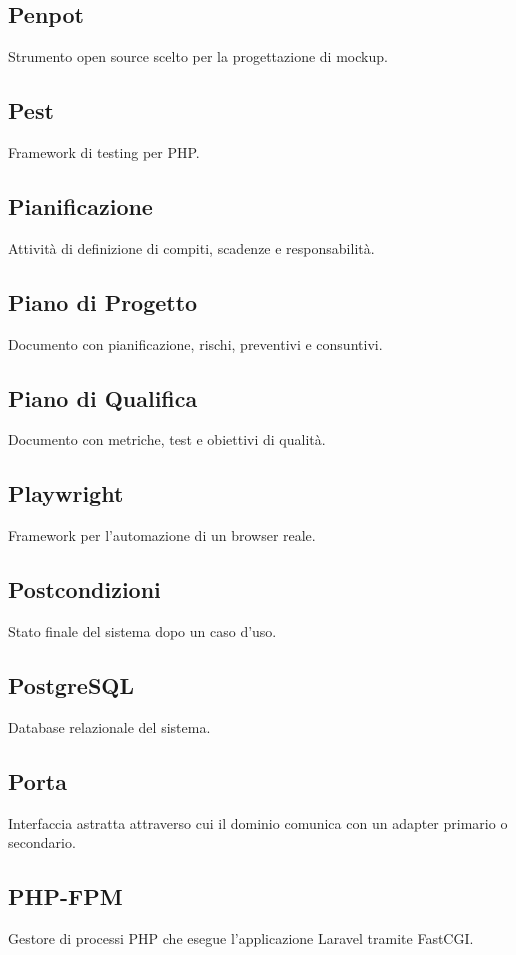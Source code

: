 \documentclass[a4paper,12pt]{article}
\begin{document}
\subsection{Penpot}
Strumento open source scelto per la progettazione di mockup.

\subsection{Pest}
Framework di testing per PHP.

\subsection{Pianificazione}
Attività di definizione di compiti, scadenze e responsabilità.

\subsection{Piano di Progetto}
Documento con pianificazione, rischi, preventivi e consuntivi.

\subsection{Piano di Qualifica}
Documento con metriche, test e obiettivi di qualità.

\subsection{Playwright}
Framework per l'automazione di un browser reale.

\subsection{Postcondizioni}
Stato finale del sistema dopo un caso d'uso.

\subsection{PostgreSQL}
Database relazionale del sistema.

\subsection{Porta}
Interfaccia astratta attraverso cui il dominio comunica con un adapter primario o secondario.

\subsection{PHP-FPM}
Gestore di processi PHP che esegue l'applicazione Laravel tramite FastCGI.
\end{document}
